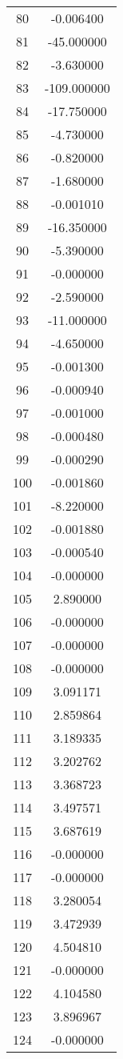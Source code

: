 \documentclass[12pt]{article}
\begin{document}
\begin{longtable}{@{}cc@{}}
80 & -0.006400 \\
81 & -45.000000 \\
82 & -3.630000 \\
83 & -109.000000 \\
84 & -17.750000 \\
85 & -4.730000 \\
86 & -0.820000 \\
87 & -1.680000 \\
88 & -0.001010 \\
89 & -16.350000 \\
90 & -5.390000 \\
91 & -0.000000 \\
92 & -2.590000 \\
93 & -11.000000 \\
94 & -4.650000 \\
95 & -0.001300 \\
96 & -0.000940 \\
97 & -0.001000 \\
98 & -0.000480 \\
99 & -0.000290 \\
100 & -0.001860 \\
101 & -8.220000 \\
102 & -0.001880 \\
103 & -0.000540 \\
104 & -0.000000 \\
105 & 2.890000 \\
106 & -0.000000 \\
107 & -0.000000 \\
108 & -0.000000 \\
109 & 3.091171 \\
110 & 2.859864 \\
111 & 3.189335 \\
112 & 3.202762 \\
113 & 3.368723 \\
114 & 3.497571 \\
115 & 3.687619 \\
116 & -0.000000 \\
117 & -0.000000 \\
118 & 3.280054 \\
119 & 3.472939 \\
120 & 4.504810 \\
121 & -0.000000 \\
122 & 4.104580 \\
123 & 3.896967 \\
124 & -0.000000 \\

\end{longtable}
\end{document}
